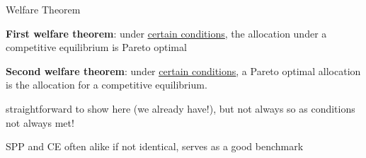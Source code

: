 \documentclass[11pt,aspectratio=169,usenames,dvipsnames]{beamer}
\let\tempone\itemize
\let\temptwo\enditemize
\renewenvironment{itemize}{\tempone\addtolength{\itemsep}{\fill}}{\temptwo}
\begin{document}
\begin{frame}{Welfare Theorem}
\label{slide:Welfare_Theorem}
    \begin{itemize}
        \item \textbf{First welfare theorem}: under \href{https://en.wikipedia.org/wiki/Fundamental_theorems_of_welfare_economics}{\underline{\alert{certain conditions}}}, the allocation under a competitive equilibrium is Pareto optimal
        \item \textbf{Second welfare theorem}: under \href{https://en.wikipedia.org/wiki/Fundamental_theorems_of_welfare_economics}{\underline{\alert{certain conditions}}}, a Pareto optimal allocation is the allocation for a competitive equilibrium.
        \item straightforward to show here (we already have!), but not always so as conditions not always met!
        \item SPP and CE often alike if not identical, serves as a good benchmark
    \end{itemize}
\end{frame}
\end{document}
